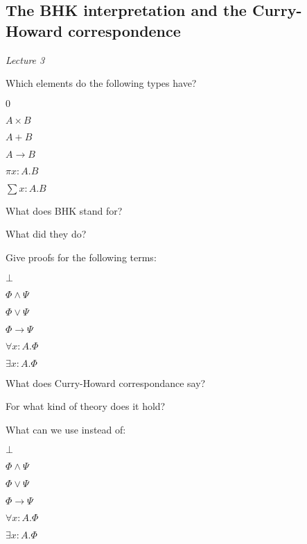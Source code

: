 \documentclass[fleqn]{article}
\begin{document}
\subsection{The BHK interpretation and the Curry-Howard correspondence}
\textit{Lecture 3}
\begin{enumerate}
    \item Which elements do the following types have?
    \begin{itemize}
        \item $0$
        \item $A \times B$
        {\color{red}\item $A + B$}
        {\color{red}\item $A \rightarrow B$}
        {\color{blue}\item $\pi x: A.B$}
        {\color{red}\item $\sum x: A.B$}
    \end{itemize}
    {\color{blue}\item What does BHK stand for?}
    {\color{red}\item What did they do?}
    {\color{red}\item Give proofs for the following terms:}
    \begin{itemize}
        {\color{red}\item $\bot$}
        \item $\Phi \wedge \Psi$
        \item $\Phi \vee \Psi$
        {\color{red}\item $\Phi \rightarrow \Psi$}
        {\color{blue}\item $\forall x : A. \Phi$}
        {\color{blue}\item $\exists x: A. \Phi$}
    \end{itemize}
    {\color{red}\item What does Curry-Howard correspondance say?}
    {\color{red}\item For what kind of theory does it hold?}
    \item What can we use instead of:
    \begin{itemize}
        \item $\bot$
        \item $\Phi \wedge \Psi$
        \item $\Phi \vee \Psi$
        \item $\Phi \rightarrow \Psi$
        {\color{red}\item $\forall x : A. \Phi$}
        {\color{red}\item $\exists x: A. \Phi$}

\end{itemize}
\end{enumerate}
\end{document}
